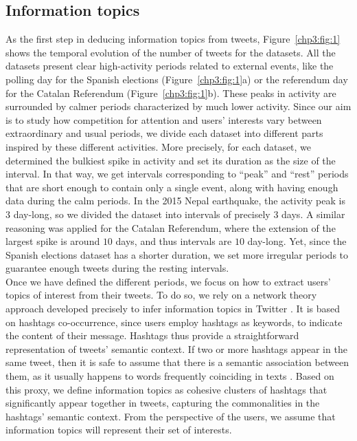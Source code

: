 \subsection{Information topics}
\label{chp3:1.2}

As the first step in deducing information topics from tweets, Figure~\ref{chp3:fig:1} shows the temporal evolution of the number of tweets for the datasets. All the datasets present clear high-activity periods related to external events, like the polling day for the Spanish elections (Figure~\ref{chp3:fig:1}a) or the referendum day for the Catalan Referendum (Figure~\ref{chp3:fig:1}b). These peaks in activity are surrounded by calmer periods characterized by much lower activity.  Since our aim is to study how competition for attention and users' interests vary between extraordinary and usual periods, we divide each dataset into different parts inspired by these different activities. More precisely,  for each dataset,  we determined the bulkiest spike in activity and set its duration as the size of the interval. In that way, we get intervals corresponding to ``peak'' and ``rest'' periods that are short enough to contain only a single event, along with having enough data during the calm periods. In the 2015 Nepal earthquake, the activity peak is $3$ day-long,  so we divided the dataset into intervals of precisely $3$ days. A similar reasoning was applied for the Catalan Referendum, where the extension of the largest spike is around $10$ days, and thus intervals are $10$ day-long. Yet,  since the Spanish elections dataset has a shorter duration, we set more irregular periods to guarantee enough tweets during the resting intervals.  \\


Once we have defined the different periods, we focus on how to extract users' topics of interest from their tweets. To do so, we rely on a network theory approach developed precisely to infer information topics in Twitter \cite{weng2015topicality,cardoso2019topics,mussi2021topics}. It is based on hashtags co-occurrence, since users employ hashtags as keywords, to indicate the content of their message. Hashtags thus provide a straightforward representation of tweets' semantic context. If two or more hashtags appear in the same tweet, then it is safe to assume that there is a semantic association between them, as it usually happens to words frequently coinciding in texts \cite{turney2010words,martinez2011disentangling}. Based on this proxy,  we define information topics as cohesive clusters of hashtags that significantly appear together in tweets, capturing the commonalities in the hashtags' semantic context. From the perspective of the users, we assume that information topics will represent their set of interests. \\


